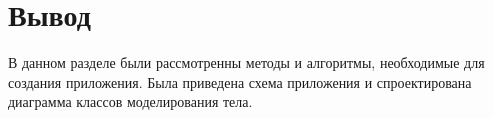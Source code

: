 




\section{Вывод}
В данном разделе были рассмотренны методы и алгоритмы, необходимые для создания 
приложения. Была приведена схема приложения и спроектирована
диаграмма классов моделирования тела.


